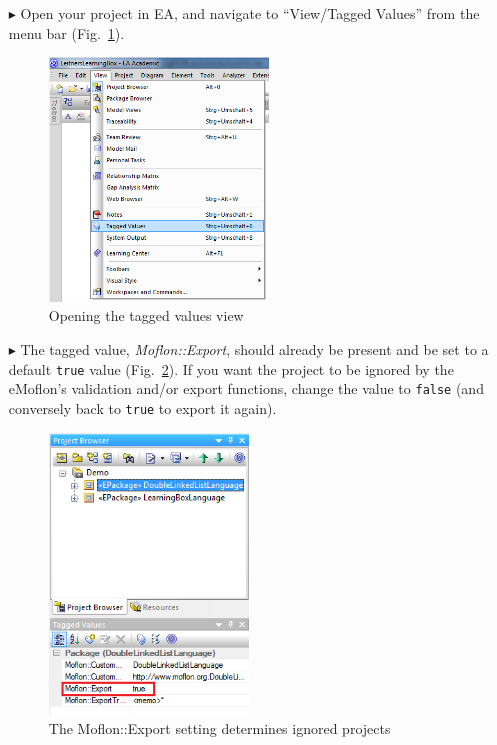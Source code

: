 \begin{enumerate}

\item[$\blacktriangleright$] Open your project in EA, and navigate to ``View/Tagged Values'' from the menu bar (Fig.~\ref{ea:view/Taggedvalues}).

\begin{figure}[htbp]
\begin{center}  \includegraphics[width=0.55\textwidth]{ea_viewTaggedValues}
  \caption{Opening the tagged values view}  
  \label{ea:view/Taggedvalues}
\end{center}
\end{figure} 

\item[$\blacktriangleright$] The tagged value, \emph{Moflon::Export}, should already be present and be set to a default \texttt{true} value
(Fig.~\ref{ea:moflonExportTG}). If you want the project to be ignored by the eMoflon's validation and/or export functions, change the value to
\texttt{false} (and conversely back to \texttt{true} to export it again).

\begin{figure}[htbp]
\begin{center}
\includegraphics[width=0.5\textwidth]{ea_moflonExportTG}
  \caption{The Moflon::Export setting determines ignored projects}  
  \label{ea:moflonExportTG}
\end{center}
\end{figure}

\end{enumerate}
